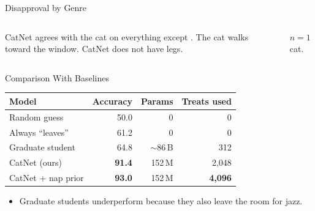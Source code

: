 \documentclass[10pt,aspectratio=169,xcolor=table]{beamer}
\begin{document}
\begin{frame}{Disapproval by Genre}
  \begin{columns}[c]
      \begin{finding}
        CatNet agrees with the cat on everything except .
        The cat walks toward the window. CatNet does not have legs.
      \end{finding}
      \begin{limitation}
        $n = 1$ cat.
      \end{limitation}
  \end{columns}
\end{frame}

\begin{frame}{Comparison With Baselines}
  \centering
  \begin{tabular}{lrrr}
    \toprule
    \textbf{Model} & \textbf{Accuracy} & \textbf{Params} & \textbf{Treats used} \\
    \midrule
    Random guess         & 50.0 & 0     & 0 \\
    Always ``leaves''    & 61.2 & 0     & 0 \\
    Graduate student     & 64.8 & $\sim$86\,B & 312 \\
    CatNet (ours)        & \textbf{91.4} & 152\,M & 2{,}048 \\
    CatNet + nap prior   & \textbf{93.0} & 152\,M & \textbf{4{,}096} \\
    \bottomrule
  \end{tabular}
  \bigskip

  \begin{itemize}
    \item Graduate students underperform because they also leave the room for jazz.
  \end{itemize}
\end{frame}
\end{document}
